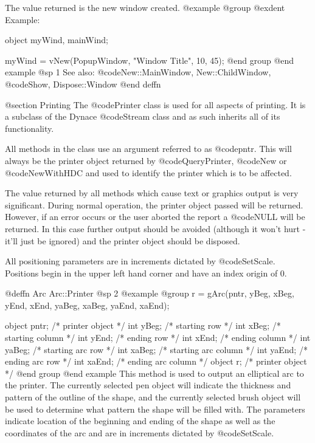 The value returned is the new window created.
@example
@group
@exdent Example:

object  myWind, mainWind;

myWind = vNew(PopupWindow, "Window Title", 10, 45);
@end group
@end example
@sp 1
See also:  @code{New::MainWindow, New::ChildWindow,}
      @code{Show, Dispose::Window}
@end deffn




@section Printing
The @code{Printer} class is used for all aspects of printing.
It is a subclass of the Dynace @code{Stream} class and as
such inherits all of its functionality.

All methods in the class use an argument referred to as @code{pntr}.
This will always be the printer object returned by @code{QueryPrinter},
@code{New} or @code{NewWithHDC} and used to identify the printer
which is to be affected.

The value returned by all methods which cause text or graphics output is
very significant.  During normal operation, the printer object passed
will be returned.  However, if an error occurs or the user aborted the
report a @code{NULL} will be returned.  In this case further output
should be avoided (although it won't hurt - it'll just be ignored) and
the printer object should be disposed.

All positioning parameters are in increments dictated by
@code{SetScale}.  Positions begin in the upper left hand corner and have
an index origin of 0.



















@deffn {Arc} Arc::Printer
@sp 2
@example
@group
r = gArc(pntr, yBeg, xBeg, yEnd, xEnd, yaBeg, xaBeg, yaEnd, xaEnd);

object  pntr;   /*  printer object         */
int     yBeg;   /*  starting row           */
int     xBeg;   /*  starting column        */
int     yEnd;   /*  ending row             */
int     xEnd;   /*  ending column          */
int     yaBeg;  /*  starting arc row       */
int     xaBeg;  /*  starting arc column    */
int     yaEnd;  /*  ending arc row         */
int     xaEnd;  /*  ending arc column      */
object  r;      /*  printer object         */
@end group
@end example
This method is used to output an elliptical arc to the printer.  The
currently selected pen object will indicate the thickness and pattern of
the outline of the shape, and the currently selected brush object will
be used to determine what pattern the shape will be filled with.  The
parameters indicate location of the beginning and ending of the shape as
well as the coordinates of the arc and are in increments dictated by
@code{SetScale}.

